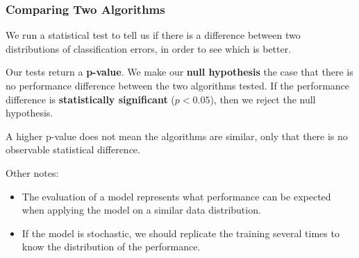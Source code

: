 \documentclass[11pt]{article}
\begin{document}
\subsubsection{Comparing Two Algorithms}
We run a statistical test to tell us if there is a difference between two distributions of classification errors, in order to see which is better.

Our tests return a \textbf{p-value}.
We make our \textbf{null hypothesis} the case that there is no performance difference between the two algorithms tested.
If the performance difference is \textbf{statistically significant} ($p < 0.05$), then we reject the null hypothesis.

A higher p-value does not mean the algorithms are similar, only that there is no observable statistical difference.

Other notes:
\begin{itemize}
  \item The evaluation of a model represents what performance can be expected when applying the model on a similar data distribution.
  \item If the model is stochastic, we should replicate the training several times to know the distribution of the performance.
\end{itemize}
\end{document}
